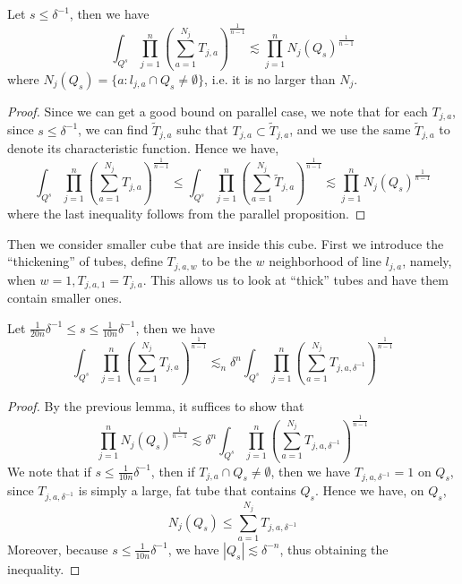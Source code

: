 \begin{lemma}
    Let $s\leq\delta^{-1}$, then we have
    \begin{equation*}
        \int_{Q^s}\prod_{j=1}^n\left(\sum_{a=1}^{N_j}T_{j,a}\right)^{\frac{1}{n-1}}\lesssim \prod_{j=1}^nN_j(Q_s)^{\frac{1}{n-1}}
    \end{equation*}
    where $N_j(Q_s)=\{a: l_{j,a}\cap Q_s\neq\emptyset \}$, i.e. it is no larger than $N_j$.
\end{lemma}
\begin{proof}
    Since we can get a good bound on parallel case, we note that for each $T_{j,a}$, since $s\leq\delta^{-1}$, we can find $\tilde{T}_{j,a}$ suhc that $T_{j,a}\subset\tilde{T}_{j,a}$, and we use the same $\tilde{T}_{j,a}$ to denote its characteristic function. Hence we have,
    \begin{equation*}
        \int_{Q^s}\prod_{j=1}^n\left(\sum_{a=1}^{N_j}T_{j,a}\right)^{\frac{1}{n-1}}\leq \int_{Q^s}\prod_{j=1}^n\left(\sum_{a=1}^{N_j}\tilde{T}_{j,a}\right)^{\frac{1}{n-1}}\lesssim \prod_{j=1}^nN_j(Q_s)^{\frac{1}{n-1}}
    \end{equation*}
    where the last inequality follows from the parallel proposition.
\end{proof}

Then we consider smaller cube that are inside this cube. First we introduce the ``thickening'' of tubes, define $T_{j,a,w}$ to be the $w$ neighborhood of line $l_{j,a}$, namely, when $w=1, T_{j,a,1}=T_{j,a}$. This allows us to look at ``thick'' tubes and have them contain smaller ones.
\begin{lemma}
    Let $\frac{1}{20n}\delta^{-1}\leq s\leq\frac{1}{10n}\delta^{-1}$, then we have
    \begin{equation*}
        \int_{Q^s}\prod_{j=1}^n\left(\sum_{a=1}^{N_j}T_{j,a}\right)^{\frac{1}{n-1}}\lesssim_n \delta^n\int_{Q^s}\prod_{j=1}^n \left(\sum_{a=1}^{N_j}T_{j,a,\delta^{-1}} \right)^{\frac{1}{n-1}}
    \end{equation*}
\end{lemma}
\begin{proof}
    By the previous lemma, it suffices to show that 
    \begin{equation*}
        \prod_{j=1}^nN_j(Q_s)^{\frac{1}{n-1}}\lesssim \delta^n\int_{Q^s}\prod_{j=1}^n \left(\sum_{a=1}^{N_j}T_{j,a,\delta^{-1}} \right)^{\frac{1}{n-1}}
    \end{equation*}
    We note that if $s\leq\frac{1}{10n}\delta^{-1}$, then if $T_{j,a}\cap Q_s\neq\emptyset$, then we have $T_{j,a,\delta^{-1}}=1$ on $Q_s$, since $T_{j,a,\delta^{-1}}$ is simply a large, fat tube that contains $Q_s$. Hence we have, on $Q_s$, 
    \begin{equation*}
        N_j(Q_s)\leq\sum_{a=1}^{N_j}T_{j,a,\delta^{-1}}
    \end{equation*}
    Moreover, because $s\leq\frac{1}{10n}\delta^{-1}$, we have $|Q_s|\lesssim\delta^{-n}$, thus obtaining the inequality.
\end{proof}

